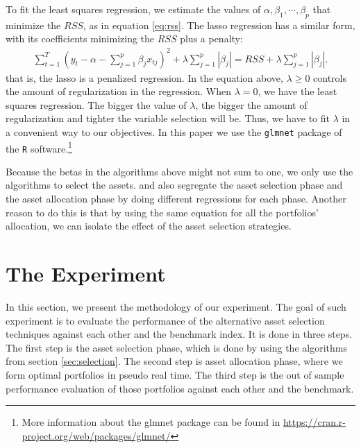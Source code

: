 \documentclass[preprint, doubleblind, authoryear,10pt]{elsarticle}
\begin{document}
To fit the least squares regression, we estimate the values of $\alpha, \beta_1, \cdots, \beta_p$ that minimize the $RSS$, as in equation \eqref{eq:rss}.
The lasso regression has a similar form, with its coefficients minimizing the $RSS$ plus a penalty: 
\begin{align} \label{lasso-reg} %
\sum_{t=1}^{T} 
\left( y_t - \alpha - \sum_{j=1}^{p} \beta_j x_{tj} \right)^2 +
\lambda \sum_{j=1}^{p} |\beta_{j}| =
	RSS + 
	\lambda \sum_{j=1}^{p} |\beta_{j}| .
\end{align}
that is, the lasso is a penalized regression.
In the equation above, $\lambda \geq 0$ controls the amount of regularization in the regression.
When $\lambda = 0$, we have the least squares regression.
The bigger the value of $\lambda$, the bigger the amount of regularization and tighter the variable selection will be.
Thus, we have to fit $\lambda$ in a convenient way to our objectives.
In this paper we use the \texttt{glmnet} package of the \texttt{R} software.\footnote{More information about the glmnet package can be found in \url{https://cran.r-project.org/web/packages/glmnet/}}

Because the betas in the algorithms above might not sum to one, we only use the algorithms to select the assets.
\cite{nnl14} and \cite{nnen14} also segregate the asset selection phase and the asset allocation phase by doing different regressions for each phase.
Another reason to do this is that by using the same equation for all the portfolios' allocation, we can isolate the effect of the asset selection strategies.

\section{The Experiment} \label{sec:experiment}

In this section, we present the methodology of our experiment.
The goal of such experiment is to evaluate the performance of the alternative asset selection techniques against each other and the benchmark index.
It is done in three steps.
The first step is the asset selection phase, which is done by using the algorithms from section \ref{sec:selection}.
The second step is asset allocation phase, where we form optimal portfolios in pseudo real time.
The third step is the out of sample performance evaluation of those portfolios against each other and the benchmark.
\end{document}

